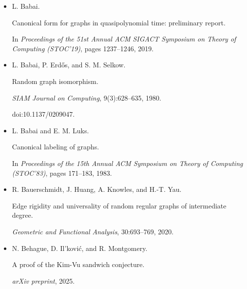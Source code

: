 \begin{itemize}
L. Babai.


Graph isomorphism in quasipolynomial time.


In \emph{Proceedings of the 48th Annual ACM Symposium on Theory of
Computing (STOC’16)}, pages 684–697, 2016.





\item[] 
[7]

L. Babai.


Canonical form for graphs in quasipolynomial time: preliminary
report.


In \emph{Proceedings of the 51st Annual ACM SIGACT Symposium on Theory
of Computing (STOC’19)}, pages 1237–1246, 2019.





\item[] 
[8]

L. Babai, P. Erdős, and S. M. Selkow.


Random graph isomorphism.


\emph{SIAM Journal on Computing}, 9(3):628–635, 1980.


doi:10.1137/0209047.





\item[] 
[9]

L. Babai and E. M. Luks.


Canonical labeling of graphs.


In \emph{Proceedings of the 15th Annual ACM Symposium on Theory of
Computing (STOC’83)}, pages 171–183, 1983.





\item[] 
[10]

R. Bauerschmidt, J. Huang, A. Knowles, and H.-T. Yau.


Edge rigidity and universality of random regular graphs of
intermediate degree.


\emph{Geometric and Functional Analysis}, 30:693–769, 2020.





\item[] 
[11]

N. Behague, D. Il’ković, and R. Montgomery.


A proof of the Kim-Vu sandwich conjecture.


\emph{arXiv preprint}, 2025.



\end{itemize}

